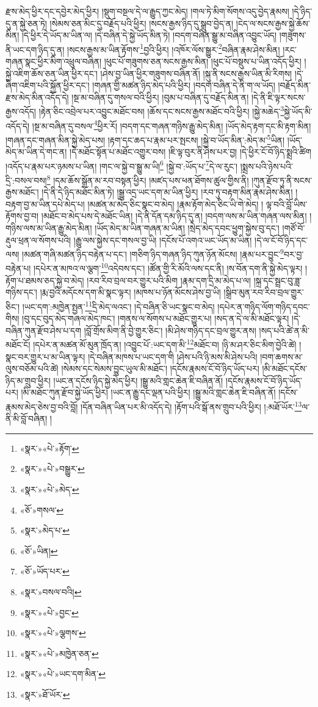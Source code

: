 རྫས་མེད་ཕྱིར་དང་དབྱེར་མེད་ཕྱིར། །སྡུག་བསྔལ་དེ་ལ་རྒྱུད་ཀྱང་མེད། །གལ་ཏེ་མིག་སོགས་འདུ་བྱེད་རྣམས། །དེ་ཉིད་དུ་ན་སྐྱེ་ཅན་ཏེ། །སེམས་ཅན་མིང་དུ་བརྗོད་པའི་ཕྱིར། །སངས་རྒྱས་ཉིད་དུ་སྒྲུབ་བྱེད་ན། །ངེད་ལ་སངས་རྒྱས་སྐྱེ་ཆོས་མིན། །དེ་ཕྱིར་དེ་ཡོད་མ་ཡིན་ལ། །དེ་བཞིན་དེ་སྐྱེ་ཡོད་མིན་ཏེ། །བདག་བཞིན་སྒྱུ་མ་བཞིན་འབྱུང་ཡོད། །གཟུགས་ནི་ཡང་དག་ཉིད་དུ་ན། །སངས་རྒྱས་མ་ཡིན་རྟོགས་\footnote{«སྣར་»«པེ་»རྟོག་}བྱའི་ཕྱིར། །འཁོར་ལོས་སྒྱུར་\footnote{«སྣར་»«པེ་»བསྒྱུར་}བཞིན་རྣམ་ཤེས་མིན། །རང་གཞན་སྣང་ཕྱིར་མིག་འཕྲུལ་བཞིན། །ཕུང་པོ་གཟུགས་ཅན་སངས་རྒྱས་མིན། །ཕུང་པོ་བསྡུས་པ་ཡིན་འདོད་ཕྱིར། །སྐྱེ་འཇིག་ཆོས་ཅན་ཡིན་ཕྱིར་དང་། །ཤེས་བྱ་ཡིན་ཕྱིར་གཟུགས་བཞིན་ནོ། །སྐུ་ནི་སངས་རྒྱས་ཡིན་མི་རིགས། །དེ་ཞིག་འཇིག་པའི་སྐྱོན་ཕྱིར་དང་། །གཞན་གྱི་མཚན་ཉིད་མེད་པའི་ཕྱིར། །བདག་བཞིན་དེ་ནི་ག་ལ་ཡོད། །བརྗོད་མིན་རྫས་མེད་མིན་འདོད་དེ། །སྔ་མ་བཞིན་དུ་གསལ་བའི་ཕྱིར། །བུམ་པ་བཞིན་དུ་བརྗོད་མིན་ན། །དེ་ནི་ཇི་ལྟར་སངས་རྒྱས་འདོད། །རྟེན་ཅིང་འབྲེལ་པར་འབྱུང་མཐོང་བས། །ཆོས་དང་སངས་རྒྱས་མཐོང་བའི་ཕྱིར། །སྐྱེ་མཆེད་\footnote{«སྣར་»«པེ་»མེད་}སྐྱེ་ཡོད་མི་འདོད་དེ། །སྔ་མ་བཞིན་དུ་བསལ་\footnote{«ཅོ་»གསལ་}ཕྱིར་རོ། །བདག་དང་གཞན་གཉིས་རྒྱུ་མེད་མིན། །ཡོད་མེད་རྟག་དང་མི་རྟག་མིན། །གཞན་དང་གཞན་མིན་སྐྱེ་མེད་པས། །རྟག་དང་ཆད་པ་རྣམ་པར་སྤངས། །སྐྱེ་བ་ཡོད་མིན་:མེད་མ་\footnote{«སྣར་»མེད་པ་}ཡིན། །ཡོད་མེད་མ་ཡིན་དེ་གང་ན། །དེ་མཐོང་སྟོན་པ་མཐོང་འགྱུར་བས། །ཇི་ལྟ་བུར་ནི་ཤེས་པར་བྱ། །དེ་ཕྱིར་ངོ་བོ་ཉིད་སྨྲའི་ཚིག །འདོད་པ་རྣམ་པར་ཉམས་པ་ཡིན། །གང་ལ་སྐྱེ་བ་སྒྱུ་མ་ཡི།\footnote{«ཅོ་»ཡིན།} །སྐྱེ་བ་:ཡོད་པ་\footnote{«ཅོ་»ཡོད་པར་}དེ་ལ་རུང་། །སྨྲས་པའི་ཉེས་པའི་དྲི་:བསལ་བས།\footnote{«སྣར་»བསལ་བའི།} །དམ་ཆོས་སྒྲོན་མ་རབ་བསྟན་ཕྱིར། །མཛད་པས་ཕན་ཐོགས་ཚུལ་གྱིས་ནི། །ཀུན་རྫོབ་ཏུ་ནི་སངས་རྒྱས་མཐོང་། །དེ་ནི་དེ་ཉིད་མཐོང་མིན་ཏེ། །སྒྱུ་འདྲ་ཡང་དག་མ་ཡིན་ཕྱིར། །རབ་ཏུ་བརྟག་མིན་རྣམ་ཤེས་མིན། །བརྟག་བྱ་མ་ཡིན་དཔེ་མེད་པ། །མཚན་མ་མེད་ཅིང་སྣང་བ་མེད། །རྣམ་རྟོག་མེད་ཅིང་ཡི་གེ་མེད། །
ལྟ་བའི་བློ་ཡིས་རྟོགས་བྱ་བ། །མཐོང་བ་མེད་པས་དེ་མཐོང་ཡིན། །དེ་ནི་དོན་དམ་ཉིད་དུ་ན། །བདག་ལས་མ་ཡིན་གཞན་ལས་མིན། །གཉིས་ལས་མ་ཡིན་རྒྱུ་མེད་མིན། །ཡོད་མེད་མ་ཡིན་གཞན་མ་ཡིན། །སྲེད་མེད་དབང་ཕྱུག་སྐྱེས་བུ་དང་། །གཙོ་བོ་རྡུལ་ཕྲན་ལ་སོགས་པའི། །རྒྱུ་ལས་སྐྱེས་དང་གསལ་བྱ་ཡི། །དངོས་པོ་འགའ་ཡང་ཡོད་མ་ཡིན། །དེ་ལ་ངོ་བོ་ཉིད་དང་ལས། །མཚན་གཞི་མཚན་ཉིད་བརྟེན་པ་དང་། །གཅིག་ཉིད་གཞན་ཉིད་ཀུན་ཉོན་མོངས། །རྣམ་པར་བྱུང་\footnote{«སྣར་»«པེ་»བྱང་}བར་བྱ་བརྟེན་པ། །དཔེར་ན་མཁའ་ལ་ལྕག་\footnote{«སྣར་»«པེ་»ལྕགས་}འདེབས་དང་། །ཚོན་གྱི་རི་མོའི་ལས་དང་ནི། །ས་བོན་དག་ནི་སྐྱེ་མེད་ལྟར། །རྟོག་པ་ཐམས་ཅད་སྐྱེ་བ་མེད། །རབ་རིབ་བྲལ་བར་གྱུར་པའི་མིག །རྣམ་དག་དྲི་མ་མེད་པ་ལ། །སྐྲ་དང་སྦྲང་བུ་ཟླ་གཉིས་དང་། །རྨ་བྱའི་མདོངས་དག་མི་སྣང་ལྟར། །མཁས་པ་ཉོན་མོངས་ཤེས་བྱ་ཡི། །སྒྲིབ་མུན་རབ་རིབ་བྲལ་གྱུར་ཅིང་། །ཡང་དག་:མཁྱེན་སྤྱན་\footnote{«སྣར་»«པེ་»མཁྱེན་ཅན་}དྲི་མེད་ལའང་། །དེ་བཞིན་ཅི་ཡང་སྣང་བ་མེད། །དཔེར་ན་གཉིད་ལོག་གཉིད་དབང་གིས། །བུ་དང་བུད་མེད་གཞལ་མེད་ཁང་། །གནས་ལ་སོགས་པ་མཐོང་གྱུར་པ། །སད་ན་དེ་ལ་མི་མཐོང་ལྟར། །དེ་བཞིན་ཀུན་རྫོབ་ཤེས་པ་དག །བློ་གྲོས་མིག་ནི་བྱེ་གྱུར་ཅིང་། །མི་ཤེས་གཉིད་དང་བྲལ་གྱུར་ནས། །སད་པའི་ཚེ་ན་མི་མཐོང་ངོ། །དཔེར་ན་མཚན་མོ་མུན་ཁྲོད་ན། །འབྱུང་པོ་:ཡང་དག་མི་\footnote{«སྣར་»«པེ་»ཡང་དག་མིན་}མཐོང་བ། །ཉི་མ་ཤར་ཅིང་མིག་བྱེའི་ཚེ། །སྣང་བར་གྱུར་པ་མ་ཡིན་ལྟར། །དེ་བཞིན་མཁས་པ་ཡང་དག་གི །ཤེས་པའི་ཉི་མས་མི་ཤེས་པའི། །བག་ཆགས་མ་ལུས་བཅོམ་པའི་ཚེ། །སེམས་དང་སེམས་བྱུང་ཡུལ་མི་མཐོང་། །དངོས་རྣམས་ངོ་བོ་ཉིད་ཡོད་པར། །མི་མཐོང་དངོས་ཉིད་མ་གྲུབ་ཕྱིར། །ཡང་ན་དངོས་ཉིད་སྐྱེ་མེད་ཕྱིར། །སྒྱུ་མའི་གླང་ཆེན་ཇི་བཞིན་ནོ། །དངོས་རྣམས་ངོ་བོ་ཉིད་ཡོད་པར། །མི་མཐོང་ཀུན་རྫོབ་སྐྱེ་ཡོད་ཕྱིར། །ཡང་ན་རྒྱུ་དང་ལྡན་པའི་ཕྱིར། །སྒྱུ་མའི་གླང་ཆེན་ཇི་བཞིན་ནོ། །དངོས་རྣམས་མེད་ཅེས་བྱ་བའི་བློ། །དོན་བཞིན་ཡིན་པར་མི་འདོད་དེ། །རྟོག་པའི་སྒོ་ནས་གྲུབ་པའི་ཕྱིར། །:མཐོ་ཡོར་\footnote{«སྣར་»ཐོ་ཡོར་}ལ་ནི་མི་བློ་བཞིན། །
